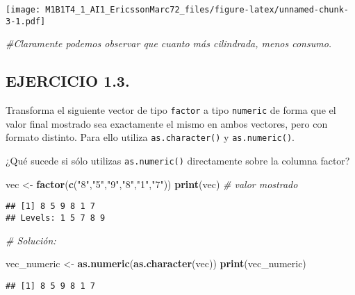 \documentclass[]{article}
\newenvironment{Shaded}{\begin{snugshade}}{\end{snugshade}}
\newcommand{\CommentTok}[1]{\textcolor[rgb]{0.56,0.35,0.01}{\textit{#1}}}
\newcommand{\KeywordTok}[1]{\textcolor[rgb]{0.13,0.29,0.53}{\textbf{#1}}}
\newcommand{\NormalTok}[1]{#1}
\newcommand{\StringTok}[1]{\textcolor[rgb]{0.31,0.60,0.02}{#1}}
\begin{document}
\texttt{[image: M1B1T4\_1\_AI1\_EricssonMarc72\_files/figure-latex/unnamed-chunk-3-1.pdf]}

\begin{Shaded}
\begin{Highlighting}[]
\CommentTok{#Claramente podemos observar que cuanto más cilindrada, menos consumo.}
\end{Highlighting}
\end{Shaded}

\hypertarget{ejercicio-1.3.}{%
\subsection{EJERCICIO 1.3.}\label{ejercicio-1.3.}}

Transforma el siguiente vector de tipo \texttt{factor} a tipo
\texttt{numeric} de forma que el valor final mostrado sea exactamente el
mismo en ambos vectores, pero con formato distinto. Para ello utiliza
\texttt{as.character()} y \texttt{as.numeric()}.

¿Qué sucede si sólo utilizas \texttt{as.numeric()} directamente sobre la
columna factor?

\begin{Shaded}
\begin{Highlighting}[]
\NormalTok{vec <-}\StringTok{ }\KeywordTok{factor}\NormalTok{(}\KeywordTok{c}\NormalTok{(}\StringTok{"8"}\NormalTok{,}\StringTok{"5"}\NormalTok{,}\StringTok{"9"}\NormalTok{,}\StringTok{"8"}\NormalTok{,}\StringTok{"1"}\NormalTok{,}\StringTok{"7"}\NormalTok{))}
\KeywordTok{print}\NormalTok{(vec) }\CommentTok{# valor mostrado}
\end{Highlighting}
\end{Shaded}

\begin{verbatim}
## [1] 8 5 9 8 1 7
## Levels: 1 5 7 8 9
\end{verbatim}

\begin{Shaded}
\begin{Highlighting}[]
\CommentTok{# Solución:}

\NormalTok{vec_numeric <-}\StringTok{ }\KeywordTok{as.numeric}\NormalTok{(}\KeywordTok{as.character}\NormalTok{(vec))}
\KeywordTok{print}\NormalTok{(vec_numeric)}
\end{Highlighting}
\end{Shaded}

\begin{verbatim}
## [1] 8 5 9 8 1 7
\end{verbatim}
\end{document}
